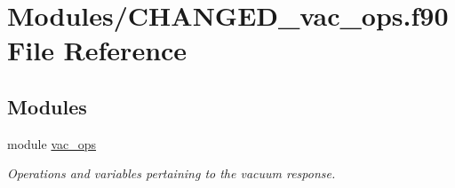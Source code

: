 \hypertarget{CHANGED__vac__ops_8f90}{}\section{Modules/\+C\+H\+A\+N\+G\+E\+D\+\_\+vac\+\_\+ops.f90 File Reference}
\label{CHANGED__vac__ops_8f90}
\subsection*{Modules}
\begin{DoxyCompactItemize}
\item 
module \hyperlink{namespacevac__ops}{vac\+\_\+ops}
\begin{DoxyCompactList}\small\item\em Operations and variables pertaining to the vacuum response. \end{DoxyCompactList}\end{DoxyCompactItemize}

